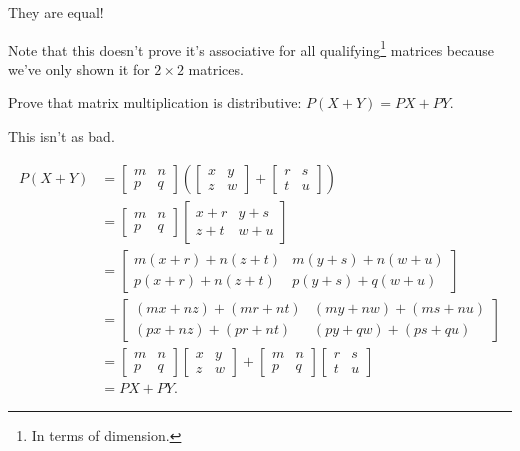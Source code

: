 \documentclass[../key.tex]{subfiles}
\begin{document}
They are equal!

Note that this doesn't prove it's associative for all qualifying\footnote{In terms of dimension.} matrices because we've only shown it for $2\times 2$ matrices.

\begin{outer_problem}
\item Prove that matrix multiplication is distributive: $P(X+Y)=PX+PY$.
\end{outer_problem}

This isn't as bad.

\begin{align*}
P(X+Y) &= \begin{bmatrix} m & n \\ p & q \end{bmatrix}\left(\begin{bmatrix} x & y \\ z & w \end{bmatrix} + \begin{bmatrix} r & s \\ t & u \end{bmatrix}\right) \\
&= \begin{bmatrix} m & n \\ p & q \end{bmatrix}\begin{bmatrix} x + r & y + s \\ z + t & w + u\end{bmatrix} \\
&= \begin{bmatrix}m(x+r) + n(z+t) & m(y+s) + n(w+u) \\ p(x+r) + n(z+t) & p(y+s) + q(w+u) \end{bmatrix} \\
&= \begin{bmatrix}(mx+nz) + (mr+nt) & (my+nw) + (ms+nu) \\ (px+nz) + (pr+nt) & (py+qw) + (ps+qu)\end{bmatrix} \\
&= \begin{bmatrix}m & n \\ p & q \end{bmatrix} \begin{bmatrix}x & y \\ z & w \end{bmatrix} + \begin{bmatrix}m & n \\ p & q \end{bmatrix} \begin{bmatrix} r & s \\ t & u \end{bmatrix} \\
&= PX + PY.
\end{align*}
\end{document}
